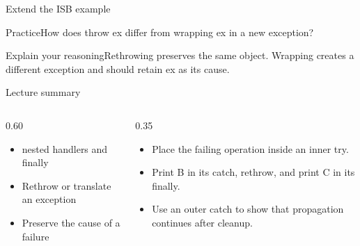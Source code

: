 \documentclass[10pt,aspectratio=169]{beamer}
\begin{document}
\begin{frame}[fragile,t]{Extend the ISB example}
\begin{alertblock}{Practice}How does throw ex differ from wrapping ex in a new exception?\end{alertblock}\vspace{3mm}\begin{exampleblock}{Explain your reasoning}Rethrowing preserves the same object. Wrapping creates a different exception and should retain ex as its cause.\end{exampleblock}
\end{frame}
\begin{frame}[fragile,t]{Lecture summary}
\begin{columns}[T,onlytextwidth]\begin{column}{0.60\textwidth}
\begin{itemize}
\item nested handlers and finally
\item Rethrow or translate an exception
\item Preserve the cause of a failure
\end{itemize}
\end{column}\begin{column}{0.35\textwidth}\small
\begin{itemize}
\item Place the failing operation inside an inner try.
\item Print B in its catch, rethrow, and print C in its finally.
\item Use an outer catch to show that propagation continues after cleanup.
\end{itemize}
\end{column}\end{columns}
\end{frame}
\end{document}
